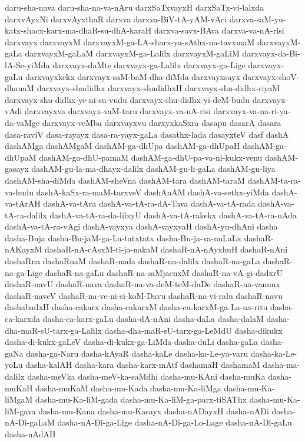 {daru-sha-nava
daru-sha-na-va-nAru
darxSaTxvayxH
darxSaTx-vi-lalxda
darxvAyxNi
darxvAyxthaR
darxva
darxva-BiV-tA-yAM-vAci
darxva-saM-yu-katx-shacx-karx-ma-dhaR-su-dhA-karaH
darxva-savx-BAva
darxva-va-nA-risi
darxvayx
darxvayxM
darxvayxM-ga-LA-sharx-ya-sAthx-na-tavxmaM
darxvayxM-gaLa
darxvayxM-gaLaM
darxvayxM-ga-Lalilx
darxvayxM-gaLiM
darxvayx-da-Bi-lA-Se-yiMda
darxvayx-daMte
darxvayx-ga-Lalilx
darxvayx-ga-Lige
darxvayx-gaLu
darxvayxkekx
darxvayx-saM-baM-dha-diMda
darxvayxsayx
darxvayx-shoV-dhanaM
darxvayx-shudidhx
darxvayx-shudidhxH
darxvayx-shu-didhx-riyaM
darxvayx-shu-didhx-ye-ni-su-vudu
darxvayx-shu-didhx-yi-deM-budu
darxvayx-vAdi
darxvayxva
darxvayx-vaM-taru
darxvayx-va-nA-risi
darxvayx-va-na-ri-ya-da-vaMge
darxvayx-veMba
darxvayxvu
darxyxkaSxra
dasapu
dasarA
dasara
dasa-raviV
dasa-rayayx
dasa-ra-yayx-gaLa
dasathx-lada
dasayxteV
dasf
dashA
dashAMga
dashAMgaM
dashAM-ga-dhUpa
dashAM-ga-dhUpaH
dashAM-ga-dhUpaM
dashAM-ga-dhU-pamaM
dashAM-ga-dhU-pa-va-ni-kukx-venu
dashAM-gasayx
dashAM-gu-la-ma-dhayx-dalilx
dashAM-gu-li-gaLa
dashAM-gu-liya
dashAM-sha-diMda
dashAM-sheVna
dashAM-tara
dashAM-taraM
dashAM-ta-ra-va-hudu
dashA-kaSx-ra-maM-tarxveV
dashAnAM
dashA-va-sethx-yiMda
dashA-va-tArAH
dashA-va-tAra
dashA-va-tA-ra-dA-Tava
dashA-va-tA-rada
dashA-va-tA-ra-dalilx
dashA-va-tA-ra-da-lilxyU
dashA-va-tA-rakekx
dashA-va-tA-ra-nAda
dashA-va-tA-ra-vAgi
dashA-vayxya
dashA-vayxyaH
dashA-yu-dhAni
dasha
dasha-Buja
dasha-Bu-jaM-ga-La-tatxtatx
dasha-Bu-ja-va-nuLaLx
dashaR-nAKayxM
dashaR-nA-cAsxM-ti-ja-nakaM
dashaR-nA-nAyxhuH
dashaR-nAni
dashaRna
dashaRnaM
dashaR-nada
dashaR-na-dalilx
dashaR-na-gaLa
dashaR-na-ga-Lige
dashaR-na-gaLu
dashaR-na-saMjacnxM
dashaR-na-vA-gi-dadxrU
dashaR-navU
dashaR-nava
dashaR-na-va-deM-teM-daDe
dashaR-na-vanunx
dashaR-naveV
dashaR-na-ve-ni-si-koM-Davu
dashaR-na-vi-ralu
dashaR-navu
dashabadxH
dasha-cakarx
dasha-cakarxM
dasha-ca-karxM-ga-La-na-ritu
dasha-ca-karxda
dasha-ca-karx-gaLu
dasha-dA-nAni
dasha-daLa
dasha-dalaM
dasha-dha-maR-sU-tarx-ga-Lalilx
dasha-dha-maR-sU-tarx-ga-LeMdU
dasha-dikukx
dasha-di-kukx-gaLeV
dasha-di-kukx-ga-LiMda
dasha-duLi
dasha-gaLa
dasha-gaNa
dasha-ga-Naru
dasha-kAyaR
dasha-kaLe
dasha-ka-Le-ya-varu
dasha-ka-Le-yoLu
dasha-kalAH
dasha-kara
dasha-karx-mAtf
dashamaH
dashamaM
dasha-ma-dalilx
dasha-meVka
dasha-meV-ka-saMdhi
dasha-mu-KAni
dasha-muKa
dasha-muKaH
dasha-muKaM
dasha-mu-Kada
dasha-mu-Ka-liMga
dasha-mu-Ka-liMgaM
dasha-mu-Ka-liM-gada
dasha-mu-Ka-liM-ga-parx-tiSAThx
dasha-mu-Ka-liM-gava
dasha-mu-Kana
dasha-mu-Kasayx
dasha-nADayxH
dasha-nADi
dasha-nA-Di-gaLaM
dasha-nA-Di-ga-Lige
dasha-nA-Di-ga-Lo-Lage
dasha-nA-Di-gaLu
dasha-nAdAH
}
